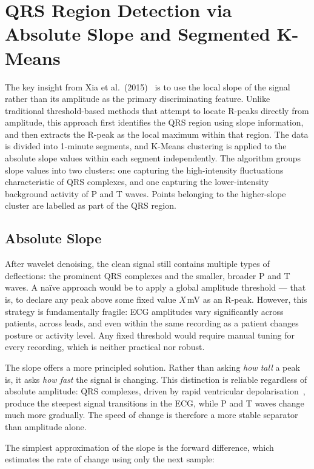 \documentclass[11pt]{article}
\begin{document}
\section{QRS Region Detection via Absolute Slope and Segmented K-Means}\label{sec:slope-kmeans}

The key insight from Xia et al.\ (2015)~\cite{xia_quick_2015} is to use the local slope of the signal rather than its amplitude as the primary discriminating feature. Unlike traditional threshold-based methods that attempt to locate R-peaks directly from amplitude, this approach first identifies the QRS region using slope information, and then extracts the R-peak as the local maximum within that region. The data is divided into 1-minute segments, and K-Means clustering is applied to the absolute slope values within each segment independently. The algorithm groups slope values into two clusters: one capturing the high-intensity fluctuations characteristic of QRS complexes, and one capturing the lower-intensity background activity of P and T waves. Points belonging to the higher-slope cluster are labelled as part of the QRS region.


\subsection{Absolute Slope}\label{subsec:slope}

After wavelet denoising, the clean signal still contains multiple types of deflections: the prominent  QRS complexes and the smaller, broader P and T waves. A naïve approach would be to apply a global amplitude threshold — that is, to declare any peak above some fixed value $X$\,mV as an R-peak. However, this strategy is fundamentally fragile: ECG amplitudes vary significantly across patients, across leads, and even within the same recording as a patient changes posture or activity level. Any fixed threshold would require manual tuning for every recording, which is neither practical nor robust.

The slope offers a more principled solution. Rather than asking \textit{how tall} a peak is, it asks \textit{how fast} the signal is changing. This distinction is reliable regardless of absolute amplitude: QRS complexes, driven by rapid ventricular depolarisation~\cite{dogan_comprehensive_2023}, produce the steepest signal transitions in the ECG, while P and T waves change much more gradually. The speed of change is therefore a more stable separator than amplitude alone.

The simplest approximation of the slope is the forward difference, which estimates the rate of change using only the next sample:
\end{document}

